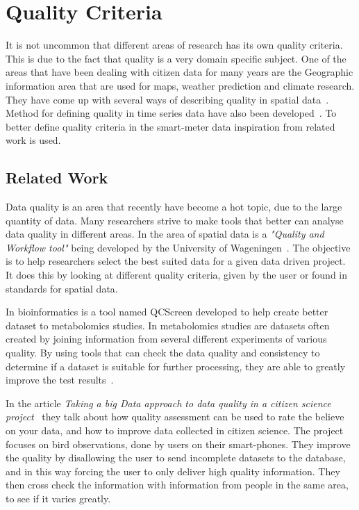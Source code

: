\section{Quality Criteria}
It is not uncommon that different areas of research has its own quality criteria. This is due to the fact that quality is a very domain specific subject. One of the areas that have been dealing with citizen data for many years are the Geographic information area that are used for maps, weather prediction and climate research. They have come up with several ways of describing quality in spatial data~\cite{RefWorks:7}. Method for defining quality in time series data have also been developed~\cite{RefWorks:6}. To better define quality criteria in the smart-meter data inspiration from related work is used.

\subsection{Related Work}
Data quality is an area that recently have become a hot topic, due to the large quantity of data. Many researchers strive to make tools that better can analyse data quality in different areas. In the area of spatial data is a \emph{"Quality and Workflow tool"} being developed by the University of Wageningen~\citep{RefWorks:8}. The objective is to help researchers select the best suited data for a given data driven project. It does this by looking at different quality criteria, given by the user or found in standards for spatial data. 

In bioinformatics is a tool named QCScreen developed to help create better dataset to metabolomics studies. In metabolomics studies are datasets often created by joining information from several different experiments of various quality. By using tools that can check the data quality and consistency to determine if a dataset is suitable for further processing, they are able to greatly improve the test results~\citep{RefWorks:9}.
 
In the article \emph{Taking a big Data approach to data quality in a citizen science project}~\citep{RefWorks:2} they talk about how quality assessment can be used to rate the believe on your data, and how to improve data collected in citizen science. The project focuses on bird observations, done by users on their smart-phones. They improve the quality by disallowing the user to send incomplete datasets to the database, and in this way forcing the user to only deliver high quality information. They then cross check the information with information from people in the same area, to see if it varies greatly. 

